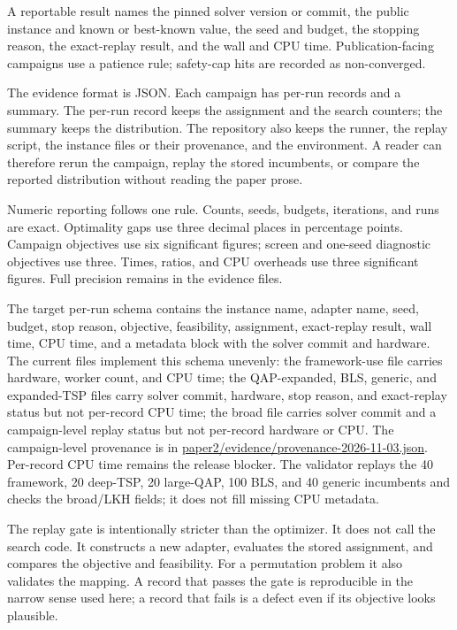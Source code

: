 \documentclass[pdflatex,sn-mathphys-num]{sn-jnl}
\begin{document}
A reportable result names the pinned solver version or commit, the public instance and known or
best-known value, the seed and budget, the stopping reason, the exact-replay result, and the wall and
CPU time. Publication-facing campaigns use a patience rule; safety-cap hits are recorded as
non-converged.

The evidence format is JSON. Each campaign has per-run records and a summary. The per-run record keeps
the assignment and the search counters; the summary keeps the distribution. The repository also keeps
the runner, the replay script, the instance files or their provenance, and the environment. A reader
can therefore rerun the campaign, replay the stored incumbents, or compare the reported distribution
without reading the paper prose.

Numeric reporting follows one rule. Counts, seeds, budgets, iterations, and runs are exact.
Optimality gaps use three decimal places in percentage points. Campaign objectives use six
significant figures; screen and one-seed diagnostic objectives use three. Times, ratios, and CPU
overheads use three significant figures. Full precision remains in the evidence files.

The target per-run schema contains the instance name, adapter name, seed, budget, stop reason,
objective, feasibility, assignment, exact-replay result, wall time, CPU time, and a metadata block
with the solver commit and hardware. The current files implement this schema unevenly: the
framework-use file carries hardware, worker count, and CPU time; the QAP-expanded, BLS, generic, and
expanded-TSP files carry solver commit, hardware, stop reason, and exact-replay status but not
per-record CPU time; the broad file carries solver commit and a campaign-level replay status but not
per-record hardware or CPU. The campaign-level provenance is in
\url{paper2/evidence/provenance-2026-11-03.json}. Per-record CPU time remains the release blocker. The
validator replays the 40 framework, 20 deep-TSP, 20 large-QAP, 100 BLS, and 40 generic incumbents and
checks the broad/LKH fields; it does not fill missing CPU metadata.

The replay gate is intentionally stricter than the optimizer. It does not call the search code. It
constructs a new adapter, evaluates the stored assignment, and compares the objective and
feasibility. For a permutation problem it also validates the mapping. A record that passes the gate
is reproducible in the narrow sense used here; a record that fails is a defect even if its objective
looks plausible.
\end{document}
